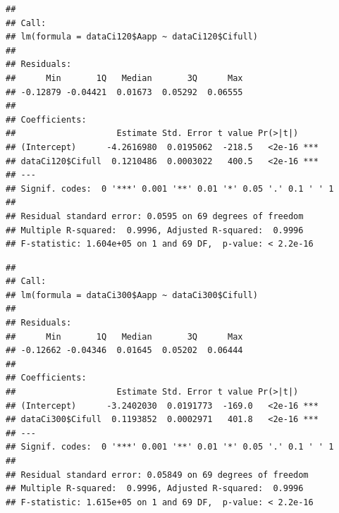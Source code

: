 \documentclass[
]{krantz}
\makeatletter
\newenvironment{Shaded}{\begin{snugshade}}{\end{snugshade}}
\newcommand{\DecValTok}[1]{\textcolor[rgb]{0.00,0.00,0.81}{#1}}
\newcommand{\KeywordTok}[1]{\textcolor[rgb]{0.13,0.29,0.53}{\textbf{#1}}}
\newcommand{\NormalTok}[1]{#1}
\newcommand{\OperatorTok}[1]{\textcolor[rgb]{0.81,0.36,0.00}{\textbf{#1}}}
\newcommand{\StringTok}[1]{\textcolor[rgb]{0.31,0.60,0.02}{#1}}
\newenvironment{kframe}{%
\medskip{}
\setlength{\fboxsep}{.8em}
 \def\at@end@of@kframe{}%
 \ifinner\ifhmode%
  \def\at@end@of@kframe{\end{minipage}}%
  \begin{minipage}{\columnwidth}%
 \fi\fi%
 \def\FrameCommand##1{\hskip\@totalleftmargin \hskip-\fboxsep
 \colorbox{shadecolor}{##1}\hskip-\fboxsep
     \hskip-\linewidth \hskip-\@totalleftmargin \hskip\columnwidth}%
 \MakeFramed {\advance\hsize-\width
   \@totalleftmargin\z@ \linewidth\hsize
   \@setminipage}}%
 {\par\unskip\endMakeFramed%
 \at@end@of@kframe}
\renewenvironment{Shaded}{\begin{kframe}}{\end{kframe}}
\makeatother
\begin{document}
\begin{verbatim}
## 
## Call:
## lm(formula = dataCi120$Aapp ~ dataCi120$Cifull)
## 
## Residuals:
##      Min       1Q   Median       3Q      Max 
## -0.12879 -0.04421  0.01673  0.05292  0.06555 
## 
## Coefficients:
##                    Estimate Std. Error t value Pr(>|t|)    
## (Intercept)      -4.2616980  0.0195062  -218.5   <2e-16 ***
## dataCi120$Cifull  0.1210486  0.0003022   400.5   <2e-16 ***
## ---
## Signif. codes:  0 '***' 0.001 '**' 0.01 '*' 0.05 '.' 0.1 ' ' 1
## 
## Residual standard error: 0.0595 on 69 degrees of freedom
## Multiple R-squared:  0.9996,	Adjusted R-squared:  0.9996 
## F-statistic: 1.604e+05 on 1 and 69 DF,  p-value: < 2.2e-16
\end{verbatim}

\begin{Shaded}
\end{Shaded}

\begin{verbatim}
## 
## Call:
## lm(formula = dataCi300$Aapp ~ dataCi300$Cifull)
## 
## Residuals:
##      Min       1Q   Median       3Q      Max 
## -0.12662 -0.04346  0.01645  0.05202  0.06444 
## 
## Coefficients:
##                    Estimate Std. Error t value Pr(>|t|)    
## (Intercept)      -3.2402030  0.0191773  -169.0   <2e-16 ***
## dataCi300$Cifull  0.1193852  0.0002971   401.8   <2e-16 ***
## ---
## Signif. codes:  0 '***' 0.001 '**' 0.01 '*' 0.05 '.' 0.1 ' ' 1
## 
## Residual standard error: 0.05849 on 69 degrees of freedom
## Multiple R-squared:  0.9996,	Adjusted R-squared:  0.9996 
## F-statistic: 1.615e+05 on 1 and 69 DF,  p-value: < 2.2e-16
\end{verbatim}
\end{document}
